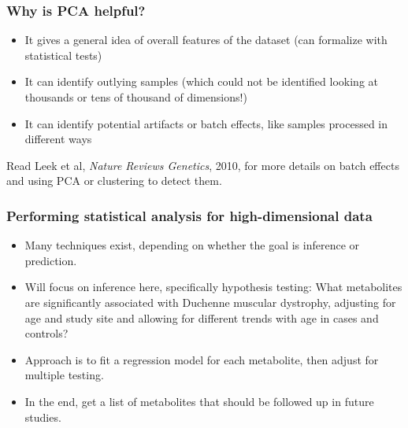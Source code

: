 \documentclass{beamer}
\begin{document}
\begin{frame}
\frametitle{Why is PCA helpful?}

\begin{itemize}
\item It gives a general idea of overall features of the dataset (can formalize with statistical tests)
\item It can identify outlying samples (which could not be identified looking at thousands or tens of thousand of dimensions!)
\item It can identify potential artifacts or batch effects, like samples processed in different ways
\end{itemize}

\vspace{0.3cm}

Read Leek et al, \textit{Nature Reviews Genetics}, 2010, for more details on batch effects and using PCA or clustering
to detect them.

\end{frame}


\begin{frame}
\frametitle{Performing statistical analysis for high-dimensional data}

\begin{itemize}
\item Many techniques exist, depending on whether the goal is inference or prediction.
\item Will focus on inference here, specifically hypothesis testing: 
{\color{orange}What metabolites are significantly associated with 
Duchenne muscular dystrophy, adjusting for age and study site and allowing for different trends with age in cases
and controls?}
\item Approach is to fit a regression model for each metabolite, then adjust for multiple testing.
\item In the end, get a list of metabolites that should be followed up in future studies.

\end{itemize}

\end{frame}

\end{document}
